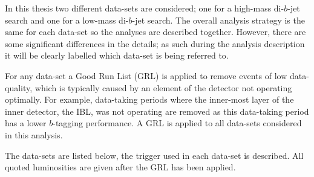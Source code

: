 In this thesis two different data-sets are considered;
one for a high-mass di-$b$-jet search and one for a low-mass di-$b$-jet search.
The overall analysis strategy is the same for each data-set so the analyses are described together.
However, there are some significant differences in the details;
as such during the analysis description it will be clearly labelled
which data-set is being referred to.

For any data-set a Good Run List (GRL)
is applied to remove events of low data-quality,
which is typically caused by an element of the detector not operating optimally.
For example, data-taking periods where the inner-most layer of the inner detector,
the IBL, was not operating are removed as
this data-taking period has a lower $b$-tagging performance.
A GRL is applied to all data-sets considered in this analysis.

The data-sets are listed below, the trigger used in each data-set is described.
All quoted luminosities are given after the GRL has been applied.

